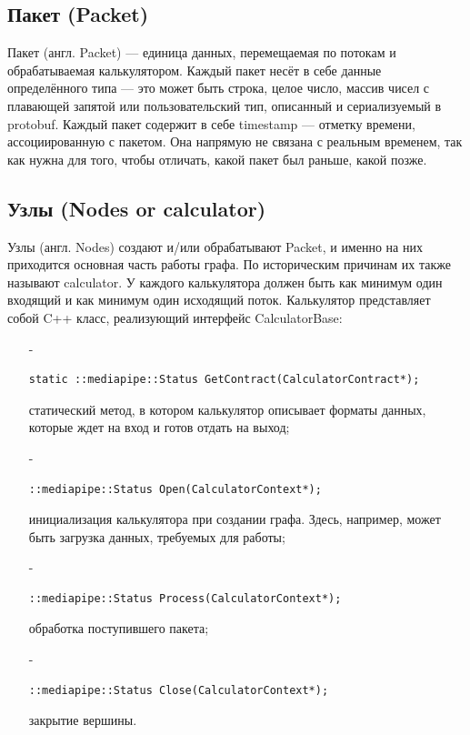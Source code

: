 \documentclass[a4paper,14pt]{extreport}
\begin{document}
            \subsection{Пакет (Packet)}
            Пакет (англ. Packet) — единица данных, перемещаемая по потокам и обрабатываемая калькулятором. Каждый пакет несёт в себе данные определённого типа — это может быть строка, целое число, массив чисел с плавающей запятой или пользовательский тип, описанный и сериализуемый в protobuf. Каждый пакет содержит в себе timestamp — отметку времени, ассоциированную с пакетом. Она напрямую не связана с реальным временем, так как нужна для того, чтобы отличать, какой пакет был раньше, какой позже. 
            
            \subsection{Узлы (Nodes or calculator)}
            Узлы (англ. Nodes) создают и/или обрабатывают Packet, и именно на них приходится основная часть работы графа. По историческим причинам их также называют calculator. У каждого калькулятора должен быть как минимум один входящий и как минимум один исходящий поток. Калькулятор представляет собой C++ класс, реализующий интерфейс CalculatorBase:
            \begin{itemize}
              \item[-] \begin{verbatim}static ::mediapipe::Status GetContract(CalculatorContract*);\end{verbatim} статический метод, в котором калькулятор описывает форматы данных, которые ждет на вход и готов отдать на выход;
              
              \item[-] \begin{verbatim}::mediapipe::Status Open(CalculatorContext*);\end{verbatim} инициализация калькулятора при создании графа. Здесь, например, может быть загрузка данных, требуемых для работы;
              
              \item[-] \begin{verbatim}::mediapipe::Status Process(CalculatorContext*);\end{verbatim} обработка поступившего пакета;
              
              \item[-] \begin{verbatim}::mediapipe::Status Close(CalculatorContext*);\end{verbatim} 
               закрытие вершины.
            \end{itemize}
            
\end{document}
